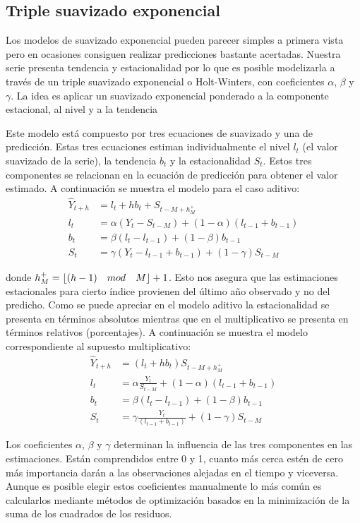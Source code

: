 \subsection{Triple suavizado exponencial}
Los modelos de suavizado exponencial pueden parecer simples a primera vista pero en ocasiones consiguen realizar predicciones bastante acertadas. Nuestra serie presenta tendencia y estacionalidad por lo que es posible modelizarla a través de un triple suavizado exponencial o Holt-Winters, con coeficientes $\alpha$, $\beta$ y $\gamma$. La idea es aplicar un suavizado exponencial ponderado a la componente estacional, al nivel y a la tendencia

Este modelo está compuesto por tres ecuaciones de suavizado y una de predicción. Estas tres ecuaciones estiman individualmente el nivel $l_t$ (el valor suavizado de la serie), la tendencia $b_t$ y la estacionalidad $S_t$. Estos tres componentes se relacionan en la ecuación de predicción para obtener el valor estimado. A continuación se muestra el modelo para el caso aditivo:
\begin{align}
  \widehat{Y}_{t+h} &= l_t + h b_t + S_{t - M + h^+_M} \\
  l_t &= \alpha(Y_t - S_{t - M}) + (1 -\alpha)(l_{t-1}+ b_{t-1}) \\
  b_t &= \beta(l_t - l_{t-1}) + (1 -\beta) b_{t-1} \\
  S_t &= \gamma(Y_t - l_{t-1} + b_{t-1}) + (1 - \gamma) S_{t-M}
\end{align}

\noindent donde $h^+_M = \lfloor(h - 1) \quad mod \quad M\rfloor + 1$. Esto nos asegura que las estimaciones estacionales para cierto índice provienen del último año observado y no del predicho. Como se puede apreciar en el modelo aditivo la estacionalidad se presenta en términos absolutos mientras que en el multiplicativo se presenta en términos relativos (porcentajes). A continuación se muestra el modelo correspondiente al supuesto multiplicativo:
\begin{align}
  \widehat{Y}_{t+h} &= (l_t + h b_t) S_{t - M + h^+_M} \\
  l_t &= \alpha \frac{Y_t}{S_{t-M}} + (1 -\alpha)(l_{t-1}+ b_{t-1}) \\
  b_t &= \beta(l_t - l_{t-1}) + (1 -\beta) b_{t-1} \\
  S_t &= \gamma \frac{Y_t}{(l_{t-1} + b_{t-1})} + (1 - \gamma) S_{t-M}
\end{align}

Los coeficientes $\alpha$, $\beta$ y $\gamma$ determinan la influencia de las tres componentes en las estimaciones. Están comprendidos entre 0 y 1, cuanto más cerca estén de cero más importancia darán a las observaciones alejadas en el tiempo y viceversa. Aunque es posible elegir estos coeficientes manualmente lo más común es calcularlos mediante métodos de optimización basados en la minimización de la suma de los cuadrados de los residuos.

